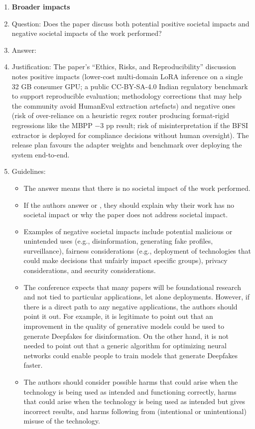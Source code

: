 \begin{enumerate}
\item {\bf Broader impacts}
    \item[] Question: Does the paper discuss both potential positive societal impacts and negative societal impacts of the work performed?
    \item[] Answer: \answerYes{}
    \item[] Justification: The paper's ``Ethics, Risks, and Reproducibility'' discussion notes positive impacts (lower-cost multi-domain LoRA inference on a single 32 GB consumer GPU; a public CC-BY-SA-4.0 Indian regulatory benchmark to support reproducible evaluation; methodology corrections that may help the community avoid HumanEval extraction artefacts) and negative ones (risk of over-reliance on a heuristic regex router producing format-rigid regressions like the MBPP $-3$ pp result; risk of misinterpretation if the BFSI extractor is deployed for compliance decisions without human oversight). The release plan favours the adapter weights and benchmark over deploying the system end-to-end.
    \item[] Guidelines:
    \begin{itemize}
        \item The answer \answerNA{} means that there is no societal impact of the work performed.
        \item If the authors answer \answerNA{} or \answerNo, they should explain why their work has no societal impact or why the paper does not address societal impact.
        \item Examples of negative societal impacts include potential malicious or unintended uses (e.g., disinformation, generating fake profiles, surveillance), fairness considerations (e.g., deployment of technologies that could make decisions that unfairly impact specific groups), privacy considerations, and security considerations.
        \item The conference expects that many papers will be foundational research and not tied to particular applications, let alone deployments. However, if there is a direct path to any negative applications, the authors should point it out. For example, it is legitimate to point out that an improvement in the quality of generative models could be used to generate Deepfakes for disinformation. On the other hand, it is not needed to point out that a generic algorithm for optimizing neural networks could enable people to train models that generate Deepfakes faster.
        \item The authors should consider possible harms that could arise when the technology is being used as intended and functioning correctly, harms that could arise when the technology is being used as intended but gives incorrect results, and harms following from (intentional or unintentional) misuse of the technology.

\end{itemize}
\end{enumerate}
